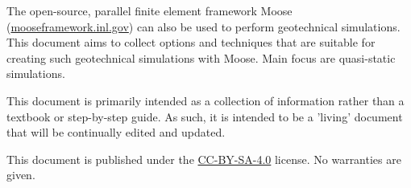 The open-source, parallel finite element framework Moose
(\url{mooseframework.inl.gov}) can also be used to perform geotechnical
simulations. This document aims to collect options and techniques that are
suitable for creating such geotechnical simulations with Moose. Main focus are
quasi-static simulations.

This document is primarily intended as a collection of information rather than
a textbook or step-by-step guide. As such, it is intended to be a 'living'
document that will be continually edited and updated.

This document is published under the
\href{https://creativecommons.org/licenses/by-sa/4.0/}{CC-BY-SA-4.0} license.
No warranties are given.